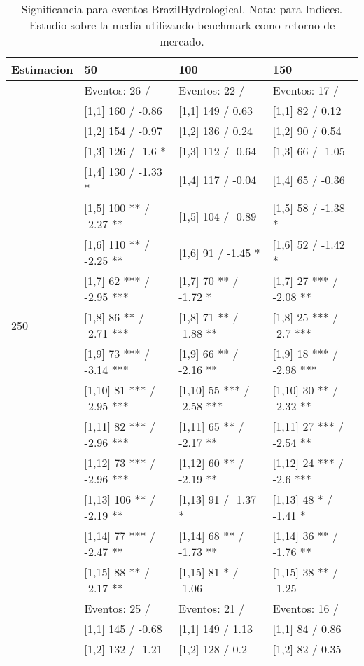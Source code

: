 \begin{table}

\caption{Significancia para eventos BrazilHydrological. Nota: para Indices. Estudio sobre la media utilizando benchmark como retorno de mercado.}
\centering
\begin{tabular}[t]{llll}
\toprule
Estimacion & 50 & 100 & 150\\
\midrule
 & Eventos:  26 / & Eventos:  22 / & Eventos:  17 /\\
 & {}[1,1] 160  / -0.86 & {}[1,1] 149  / 0.63 & {}[1,1] 82  / 0.12\\
 & {}[1,2] 154  / -0.97 & {}[1,2] 136  / 0.24 & {}[1,2] 90  / 0.54\\
 & {}[1,3] 126  / -1.6 * & {}[1,3] 112  / -0.64 & {}[1,3] 66  / -1.05\\
 & {}[1,4] 130  / -1.33 * & {}[1,4] 117  / -0.04 & {}[1,4] 65  / -0.36\\
\addlinespace
 & {}[1,5] 100 ** / -2.27 ** & {}[1,5] 104  / -0.89 & {}[1,5] 58  / -1.38 *\\
 & {}[1,6] 110 ** / -2.25 ** & {}[1,6] 91  / -1.45 * & {}[1,6] 52  / -1.42 *\\
 & {}[1,7] 62 *** / -2.95 *** & {}[1,7] 70 ** / -1.72 * & {}[1,7] 27 *** / -2.08 **\\
250 & {}[1,8] 86 ** / -2.71 *** & {}[1,8] 71 ** / -1.88 ** & {}[1,8] 25 *** / -2.7 ***\\
 & {}[1,9] 73 *** / -3.14 *** & {}[1,9] 66 ** / -2.16 ** & {}[1,9] 18 *** / -2.98 ***\\
\addlinespace
 & {}[1,10] 81 *** / -2.95 *** & {}[1,10] 55 *** / -2.58 *** & {}[1,10] 30 ** / -2.32 **\\
 & {}[1,11] 82 *** / -2.96 *** & {}[1,11] 65 ** / -2.17 ** & {}[1,11] 27 *** / -2.54 **\\
 & {}[1,12] 73 *** / -2.96 *** & {}[1,12] 60 ** / -2.19 ** & {}[1,12] 24 *** / -2.6 ***\\
 & {}[1,13] 106 ** / -2.19 ** & {}[1,13] 91  / -1.37 * & {}[1,13] 48 * / -1.41 *\\
 & {}[1,14] 77 *** / -2.47 ** & {}[1,14] 68 ** / -1.73 ** & {}[1,14] 36 ** / -1.76 **\\
\addlinespace
 & {}[1,15] 88 ** / -2.17 ** & {}[1,15] 81 * / -1.06 & {}[1,15] 38 ** / -1.25\\
 & Eventos:  25 / & Eventos:  21 / & Eventos:  16 /\\
 & {}[1,1] 145  / -0.68 & {}[1,1] 149  / 1.13 & {}[1,1] 84  / 0.86\\
 & {}[1,2] 132  / -1.21 & {}[1,2] 128  / 0.2 & {}[1,2] 82  / 0.35\\

\end{tabular}
\end{table}

